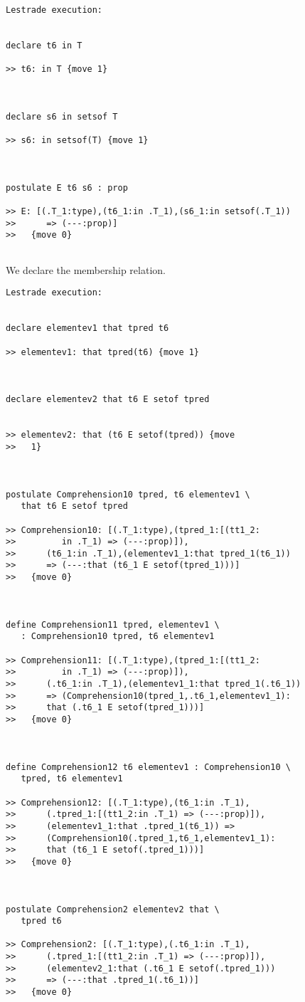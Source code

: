 \documentclass[12pt]{article}
\begin{document}
\begin{verbatim}Lestrade execution:


declare t6 in T

>> t6: in T {move 1}



declare s6 in setsof T

>> s6: in setsof(T) {move 1}



postulate E t6 s6 : prop

>> E: [(.T_1:type),(t6_1:in .T_1),(s6_1:in setsof(.T_1))
>>      => (---:prop)]
>>   {move 0}


\end{verbatim}

We declare the membership relation.

\begin{verbatim}Lestrade execution:


declare elementev1 that tpred t6

>> elementev1: that tpred(t6) {move 1}



declare elementev2 that t6 E setof tpred


>> elementev2: that (t6 E setof(tpred)) {move
>>   1}



postulate Comprehension10 tpred, t6 elementev1 \
   that t6 E setof tpred

>> Comprehension10: [(.T_1:type),(tpred_1:[(tt1_2:
>>         in .T_1) => (---:prop)]),
>>      (t6_1:in .T_1),(elementev1_1:that tpred_1(t6_1))
>>      => (---:that (t6_1 E setof(tpred_1)))]
>>   {move 0}



define Comprehension11 tpred, elementev1 \
   : Comprehension10 tpred, t6 elementev1

>> Comprehension11: [(.T_1:type),(tpred_1:[(tt1_2:
>>         in .T_1) => (---:prop)]),
>>      (.t6_1:in .T_1),(elementev1_1:that tpred_1(.t6_1))
>>      => (Comprehension10(tpred_1,.t6_1,elementev1_1):
>>      that (.t6_1 E setof(tpred_1)))]
>>   {move 0}



define Comprehension12 t6 elementev1 : Comprehension10 \
   tpred, t6 elementev1

>> Comprehension12: [(.T_1:type),(t6_1:in .T_1),
>>      (.tpred_1:[(tt1_2:in .T_1) => (---:prop)]),
>>      (elementev1_1:that .tpred_1(t6_1)) =>
>>      (Comprehension10(.tpred_1,t6_1,elementev1_1):
>>      that (t6_1 E setof(.tpred_1)))]
>>   {move 0}



postulate Comprehension2 elementev2 that \
   tpred t6

>> Comprehension2: [(.T_1:type),(.t6_1:in .T_1),
>>      (.tpred_1:[(tt1_2:in .T_1) => (---:prop)]),
>>      (elementev2_1:that (.t6_1 E setof(.tpred_1)))
>>      => (---:that .tpred_1(.t6_1))]
>>   {move 0}


\end{verbatim}
\end{document}
